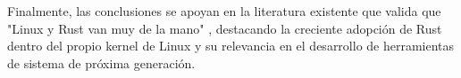 \documentclass[conference]{IEEEtran} %
\begin{document}
Finalmente, las conclusiones se apoyan en la literatura existente que valida que "Linux y Rust van muy de la mano" \cite{ojeda2021rust}, destacando la creciente adopción de Rust dentro del propio kernel de Linux y su relevancia en el desarrollo de herramientas de sistema de próxima generación.


\end{document}
